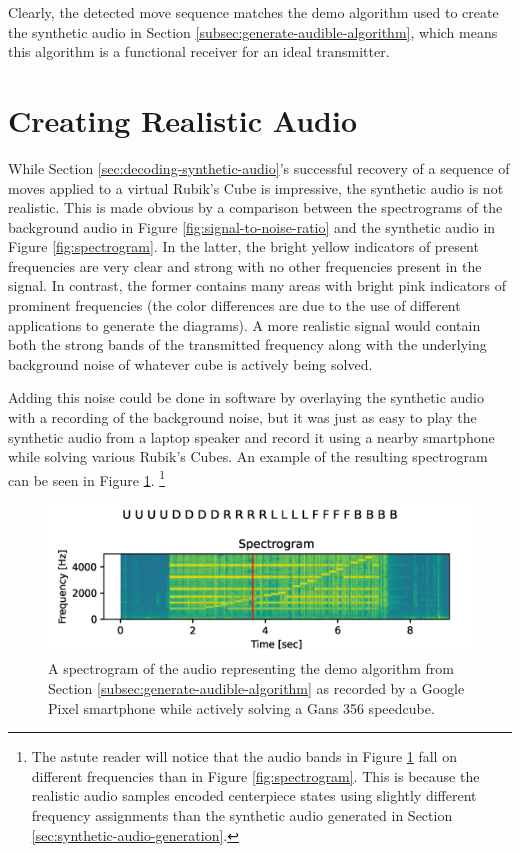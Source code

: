 Clearly, the detected move sequence matches the demo algorithm used to create the synthetic audio in Section \ref{subsec:generate-audible-algorithm}, which means this algorithm is a functional receiver for an ideal transmitter.


\newpage
\section{Creating Realistic Audio}
\label{sec:adding-realistic-noise}
While Section \ref{sec:decoding-synthetic-audio}'s successful recovery of a sequence of moves applied to a virtual Rubik's Cube is impressive, the synthetic audio is not realistic.
This is made obvious by a comparison between the spectrograms of the background audio in Figure \ref{fig:signal-to-noise-ratio} and the synthetic audio in Figure \ref{fig:spectrogram}.
In the latter, the bright yellow indicators of present frequencies are very clear and strong with no other frequencies present in the signal.
In contrast, the former contains many areas with bright pink indicators of prominent frequencies (the color differences are due to the use of different applications to generate the diagrams).
A more realistic signal would contain both the strong bands of the transmitted frequency along with the underlying background noise of whatever cube is actively being solved.

Adding this noise could be done in software by overlaying the synthetic audio with a recording of the background noise, but it was just as easy to play the synthetic audio from a laptop speaker and record it using a nearby smartphone while solving various Rubik's Cubes.
An example of the resulting spectrogram can be seen in Figure \ref{fig:noisy-spectrogram}.
\footnote{The astute reader will notice that the audio bands in Figure \ref{fig:noisy-spectrogram} fall on different frequencies than in Figure \ref{fig:spectrogram}. This is because the realistic audio samples encoded centerpiece states using slightly different frequency assignments than the synthetic audio generated in Section \ref{sec:synthetic-audio-generation}.}

\begin{figure}[h]
    \centering
    \includegraphics[width=0.8\linewidth]{Figures/5 Algorithm Design/transmitted-356-5tps.png}
    \caption{A spectrogram of the audio representing the demo algorithm from Section \ref{subsec:generate-audible-algorithm} as recorded by a Google Pixel smartphone while actively solving a Gans 356 speedcube.}
    \label{fig:noisy-spectrogram}
\end{figure}

